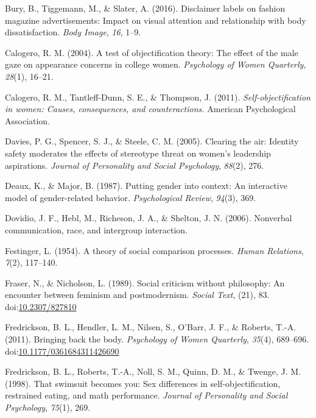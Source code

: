 \documentclass[man]{apa6}
\begin{document}
\hypertarget{ref-bury2016}{}
Bury, B., Tiggemann, M., \& Slater, A. (2016). Disclaimer labels on
fashion magazine advertisements: Impact on visual attention and
relationship with body dissatisfaction. \emph{Body Image}, \emph{16},
1--9.

\hypertarget{ref-calogero2004test}{}
Calogero, R. M. (2004). A test of objectification theory: The effect of
the male gaze on appearance concerns in college women. \emph{Psychology
of Women Quarterly}, \emph{28}(1), 16--21.

\hypertarget{ref-calogero2011}{}
Calogero, R. M., Tantleff-Dunn, S. E., \& Thompson, J. (2011).
\emph{Self-objectification in women: Causes, consequences, and
counteractions.} American Psychological Association.

\hypertarget{ref-davies2005clearing}{}
Davies, P. G., Spencer, S. J., \& Steele, C. M. (2005). Clearing the
air: Identity safety moderates the effects of stereotype threat on
women's leadership aspirations. \emph{Journal of Personality and Social
Psychology}, \emph{88}(2), 276.

\hypertarget{ref-deaux1987putting}{}
Deaux, K., \& Major, B. (1987). Putting gender into context: An
interactive model of gender-related behavior. \emph{Psychological
Review}, \emph{94}(3), 369.

\hypertarget{ref-dovidio2006nonverbal}{}
Dovidio, J. F., Hebl, M., Richeson, J. A., \& Shelton, J. N. (2006).
Nonverbal communication, race, and intergroup interaction.

\hypertarget{ref-festinger1954theory}{}
Festinger, L. (1954). A theory of social comparison processes.
\emph{Human Relations}, \emph{7}(2), 117--140.

\hypertarget{ref-frasernicholson1989}{}
Fraser, N., \& Nicholson, L. (1989). Social criticism without
philosophy: An encounter between feminism and postmodernism.
\emph{Social Text}, (21), 83.
doi:\href{https://doi.org/10.2307/827810}{10.2307/827810}

\hypertarget{ref-fredricksonetal2011}{}
Fredrickson, B. L., Hendler, L. M., Nilsen, S., O'Barr, J. F., \&
Roberts, T.-A. (2011). Bringing back the body. \emph{Psychology of Women
Quarterly}, \emph{35}(4), 689--696.
doi:\href{https://doi.org/10.1177/0361684311426690}{10.1177/0361684311426690}

\hypertarget{ref-fredrickson1998swimsuit}{}
Fredrickson, B. L., Roberts, T.-A., Noll, S. M., Quinn, D. M., \&
Twenge, J. M. (1998). That swimsuit becomes you: Sex differences in
self-objectification, restrained eating, and math performance.
\emph{Journal of Personality and Social Psychology}, \emph{75}(1), 269.
\end{document}
